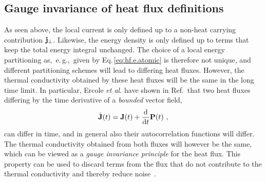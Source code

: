 \subsection{Gauge invariance of heat flux definitions}
As seen above, the local current is only defined up to a non-heat carrying contribution ${\bf j}_{\perp}$. Likewise, the energy density is only defined up to terms that keep the total energy integral unchanged. The choice of a local energy partitioning as,~e.\,g.,~given by Eq.\,\eqref{eq:hf.e.atomic} is therefore not unique, and different partitioning schemes will lead to differing heat fluxes. However, the thermal conductivity obtained by these heat fluxes will be the same in the long time limit. In particular, Ercole \emph{et al.} have shown in Ref.\,\cite{Ercole2016} that two heat fluxes differing by the time derivative of a \emph{bounded} vector field,
\begin{align}
  \tilde{{\bf J}} (t) = {\bf J} (t) + \frac{{\rm d}}{{\rm d} t} {\bf P} (t)~,
\end{align}
can differ in time, and in general also their autocorrelation functions will differ. The thermal conductivity obtained from both fluxes will however be the same, which can be viewed as a \emph{gauge invariance principle} for the heat flux. This property can be used to discard terms from the flux that do not contribute to the thermal conductivity and thereby reduce noise~\cite{Marcolongo2020}. 

